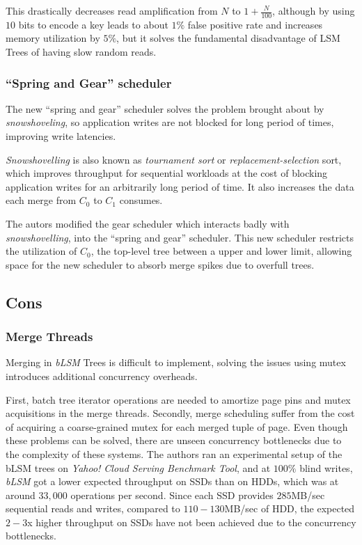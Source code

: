 \documentclass{article}
\theoremstyle{plain}
\begin{document}
\medskip
This drastically decreases read amplification from $N$ to $1+\frac{N}{100}$,
although by using $10$ bits to encode a key leads to about $1\%$ false positive
rate and increases memory utilization by $5\%$, but it solves the fundamental
disadvantage of LSM Trees of having slow random reads.

\subsubsection{``Spring and Gear'' scheduler}
The new ``spring and gear'' scheduler solves the problem brought about by
\emph{snowshoveling}, so application writes are not blocked for long period of
times, improving write latencies.

\medskip
\emph{Snowshovelling} is also known as \emph{tournament sort} or
\emph{replacement-selection} sort, which improves throughput for sequential
workloads at the cost of blocking application writes for an arbitrarily long
period of time. It also increases the data each merge from $C_{0}$ to $C_{1}$
consumes.

\medskip
The autors modified the gear scheduler which interacts badly with
\emph{snowshovelling}, into the ``spring and gear'' scheduler. This new
scheduler restricts the utilization of $C_{0}$, the top-level tree between a
upper and lower limit, allowing space for the new scheduler to absorb merge
spikes due to overfull trees.


\subsection{Cons}
\subsubsection{Merge Threads}
Merging in \emph{bLSM} Trees is difficult to implement, solving the issues using
mutex introduces additional concurrency overheads.

\medskip
First, batch tree iterator operations are needed to amortize page pins and mutex
acquisitions in the merge threads. Secondly, merge scheduling suffer from the
cost of acquiring a coarse-grained mutex for each merged tuple of page. Even
though these problems can be solved, there are unseen concurrency bottlenecks
due to the complexity of these systems. The authors ran an experimental setup of
the bLSM trees on \emph{Yahoo! Cloud Serving Benchmark Tool}, and at $100\%$
blind writes, \emph{bLSM} got a lower expected throughput on SSDs than on
HDDs, which was at around $33,000$ operations per second. Since each SSD
provides $285$MB/sec sequential reads and writes, compared to $110-130$MB/sec of
HDD, the expected $2-3$x higher throughput on SSDs have not been achieved due
to the concurrency bottlenecks.
\end{document}
